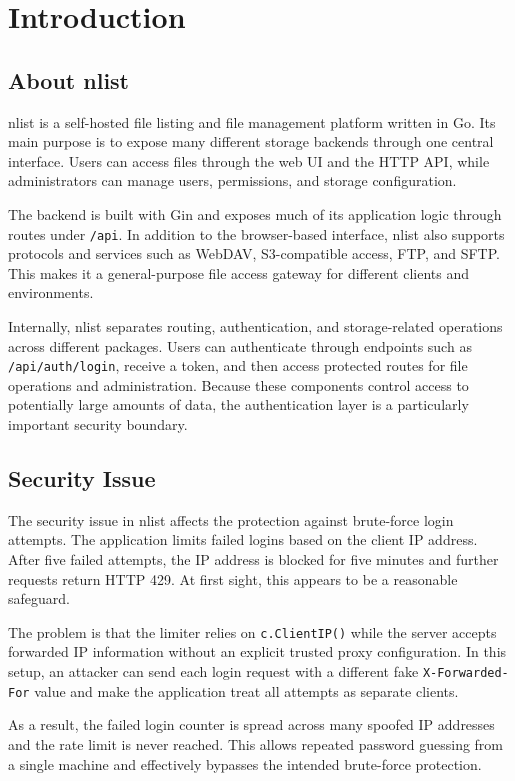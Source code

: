 \section{Introduction}

\subsection{About nlist}

\noindent nlist is a self-hosted file listing and file management platform written in Go. Its main purpose is to expose many different storage backends through one central interface. Users can access files through the web UI and the HTTP API, while administrators can manage users, permissions, and storage configuration.

\noindent The backend is built with Gin and exposes much of its application logic through routes under \texttt{/api}. In addition to the browser-based interface, nlist also supports protocols and services such as WebDAV, S3-compatible access, FTP, and SFTP. This makes it a general-purpose file access gateway for different clients and environments.

\noindent Internally, nlist separates routing, authentication, and storage-related operations across different packages. Users can authenticate through endpoints such as \texttt{/api/auth/login}, receive a token, and then access protected routes for file operations and administration. Because these components control access to potentially large amounts of data, the authentication layer is a particularly important security boundary.

\subsection{Security Issue}

\noindent The security issue in nlist affects the protection against brute-force login attempts. The application limits failed logins based on the client IP address. After five failed attempts, the IP address is blocked for five minutes and further requests return HTTP 429. At first sight, this appears to be a reasonable safeguard.

\noindent The problem is that the limiter relies on \texttt{c.ClientIP()} while the server accepts forwarded IP information without an explicit trusted proxy configuration. In this setup, an attacker can send each login request with a different fake \texttt{X-Forwarded-For} value and make the application treat all attempts as separate clients.

\noindent As a result, the failed login counter is spread across many spoofed IP addresses and the rate limit is never reached. This allows repeated password guessing from a single machine and effectively bypasses the intended brute-force protection.